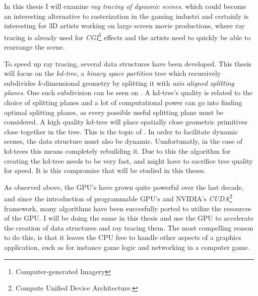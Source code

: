 
In this thesis I will examine \textit{ray tracing of dynamic scenes},
which could become an interesting alternative to rasterization in the
gaming industri and certainly is interesting for 3D artists working on
large screen movie productions, where ray tracing is already used for
\textit{CGI}\footnote{Computer-generated Imagery} effects and the
artists need to quickly be able to rearrange the scene.



To speed up ray tracing, several data structures have been
developed. This thesis will focus on the \textit{kd-tree}, a
\textit{binary space partition} tree which recursively subdivides
$k$-dimensional geometry by splitting it with \textit{axis aligned
  splitting planes}. One such subdivision can be seen on
. A kd-tree's quality is related to the choice
of splitting planes and a lot of computational power can go into
finding optimal splitting planes, as every possible useful splitting
plane must be considered. A high quality kd-tree will place spatially
close geometric primitives close together in the tree. This is the
topic of . In order to facilitate
dynamic scenes, the data structure must also be
dynamic. Uunfortunatly, in the case of kd-trees this means completely
rebuilding it. Due to this the algorithm for creating the kd-tree
needs to be very fast, and might have to sacrifice tree quality for
speed. It is this compromise that will be studied in this theses.




As observed above, the GPU's have grown quite powerful over the last
decade, and since the introduction of programmable GPU's and
NVIDIA's \textit{CUDA}\footnote{Compute Unified Device Architecture.}
framework, many algorithms have been succesfully ported to utilize the
resources of the GPU. I will be doing the same in this thesis and use
the GPU to accelerate the creation of data structures and ray tracing
them. The most compelling reason to do this, is that it leaves the CPU
free to handle other aspects of a graphics application, such as for
instance game logic and networking in a computer game.



